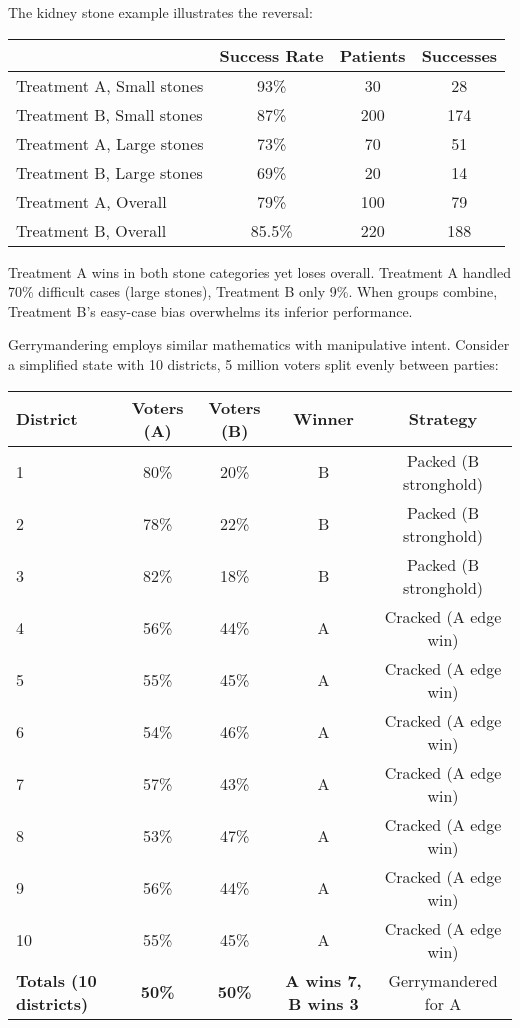 The kidney stone example illustrates the reversal:

\begin{center}
\begin{tabular}{lccc}
\toprule
 & Success Rate & Patients & Successes \\
\midrule
Treatment A, Small stones & 93\% & 30 & 28 \\
Treatment B, Small stones & 87\% & 200 & 174 \\
Treatment A, Large stones & 73\% & 70 & 51 \\
Treatment B, Large stones & 69\% & 20 & 14 \\
\midrule
Treatment A, Overall & 79\% & 100 & 79 \\
Treatment B, Overall & 85.5\% & 220 & 188 \\
\bottomrule
\end{tabular}
\end{center}

Treatment A wins in both stone categories yet loses overall. Treatment A handled 70\% difficult cases (large stones), Treatment B only 9\%. When groups combine, Treatment B's easy-case bias overwhelms its inferior performance.

Gerrymandering employs similar mathematics with manipulative intent. Consider a simplified state with 10 districts, 5 million voters split evenly between parties:

\begin{center}
  \begin{tabular}{lcccc}
  \toprule
  \textbf{District} & \textbf{Voters (A)} & \textbf{Voters (B)} & \textbf{Winner} & \textbf{Strategy} \\
  \midrule
  1 & 80\% & 20\% & B & Packed (B stronghold) \\
  2 & 78\% & 22\% & B & Packed (B stronghold) \\
  3 & 82\% & 18\% & B & Packed (B stronghold) \\
  4 & 56\% & 44\% & A & Cracked (A edge win) \\
  5 & 55\% & 45\% & A & Cracked (A edge win) \\
  6 & 54\% & 46\% & A & Cracked (A edge win) \\
  7 & 57\% & 43\% & A & Cracked (A edge win) \\
  8 & 53\% & 47\% & A & Cracked (A edge win) \\
  9 & 56\% & 44\% & A & Cracked (A edge win) \\
  10 & 55\% & 45\% & A & Cracked (A edge win) \\
  \midrule
  \textbf{Totals (10 districts)} & \textbf{50\%} & \textbf{50\%} & \textbf{A wins 7, B wins 3} & Gerrymandered for A \\
  \bottomrule
  \end{tabular}
  \end{center}

